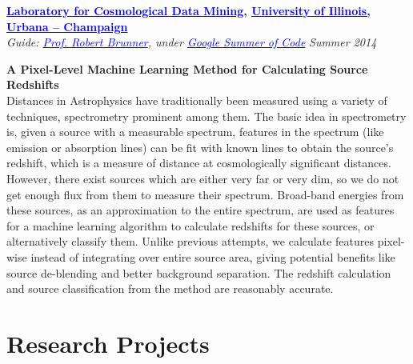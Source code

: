 \documentclass[margin,line]{res}
\newenvironment{list1}{
  \begin{list}{\ding{113}}{%
      \setlength{\itemsep}{0in}
      \setlength{\parsep}{0in} \setlength{\parskip}{0in}
      \setlength{\topsep}{0in} \setlength{\partopsep}{0in} 
      \setlength{\leftmargin}{0.17in}}}{\end{list}}
\begin{document}
\begin{resume}
{\bf \href{http://lcdm.astro.illinois.edu/}{\textcolor{blue} {Laboratory for Cosmological Data Mining}}, \href{http://www.illinois.edu/}{\textcolor{blue}{University of Illinois, Urbana -- Champaign}}} \\
{\em Guide: \href{hhttp://www.astro.illinois.edu/people/bigdog}{\textcolor{blue}{Prof. Robert Brunner}}, under \href{https://www.google-melange.com/gsoc/homepage/google/gsoc2014}{\textcolor{blue} {Google Summer of Code}}} \hfill {\it Summer 2014} \\
\vspace*{-.13in}
\begin{list1}
\item[]\textbf{A Pixel-Level Machine Learning Method for Calculating Source Redshifts} \\
Distances in Astrophysics have traditionally been measured using a variety of techniques, spectrometry prominent among them. The basic idea in spectrometry is, given a source with a measurable spectrum, features in the spectrum (like emission or absorption lines) can be fit with known lines to obtain the source's redshift, which is a measure of distance at cosmologically significant distances. However, there exist sources which are either very far or very dim, so we do not get enough flux from them to measure their spectrum. Broad-band energies from these sources, as an approximation to the entire spectrum, are used as features for a machine learning algorithm to calculate redshifts for these sources, or alternatively classify them. Unlike previous attempts, we calculate features pixel-wise instead of integrating over entire source area, giving potential benefits like source de-blending and better background separation. The redshift calculation and source classification from the method are reasonably accurate.
\end{list1}

\newpage
\section{\sc Research Projects}


\end{resume}
\end{document}
